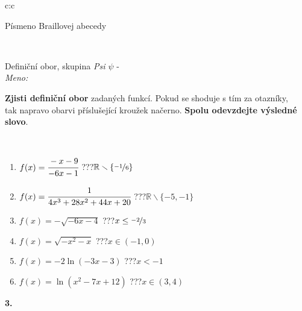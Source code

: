 \documentclass[10pt]{report}
\begin{document}
\begin{tabular}{c:c}
\begin{minipage}[c][104.5mm][t]{0.5\linewidth}
\begin{center}
\begin{minipage}{0.20\linewidth}
\begin{center}
{\small Písmeno Braillovej abecedy}
\end{center}
\end{minipage}
\end{center}
\end{minipage}
\\ \hdashline
\begin{minipage}[c][104.5mm][t]{0.5\linewidth}
\begin{center}
\vspace{7mm}
{\huge Definiční obor, skupina \textit{Psi $\psi$} -}\\[5mm]
\textit{Meno:}\phantom{xxxxxxxxxxxxxxxxxxxxxxxxxxxxxxxxxxxxxxxxxxxxxxxxxxxxxxxxxxxxxxxxx}\\[5mm]
\begin{minipage}{0.95\linewidth}
\textbf{Zjisti definiční obor} zadaných funkcí. Pokud se shoduje s tím za otazníky,\\tak napravo obarvi příslušející kroužek načerno. \textbf{Spolu odevzdejte výsledné slovo}.
\end{minipage}
\\[1mm]
\begin{minipage}{0.79\linewidth}
\begin{center}
\begin{varwidth}{\linewidth}
\begin{enumerate}
\normalsizerrr
\item $f(x)=\cfrac{-x-9}{-6x-1}$\quad \dotfill\; ???\;\dotfill \quad $\mathbb{R}\smallsetminus\{\nicefrac{-1}{6}\}$
\item $f(x)=\cfrac{1}{4x^3+28x^2+44x+20}$\quad \dotfill\; ???\;\dotfill \quad $\mathbb{R}\smallsetminus\{-5,-1\}$
\item $f(x)=-\sqrt{-6x-4}$\quad \dotfill\; ???\;\dotfill \quad $x\leq\nicefrac{-2}{3}$
\item $f(x)=\sqrt{-x^2-x}$\quad \dotfill\; ???\;\dotfill \quad $x\in(-1 , 0)$
\item $f(x)=-2\ln{(-3x-3)}$\quad \dotfill\; ???\;\dotfill \quad $x<-1$
\item $f(x)=\ln{(x^2-7x+12)}$\quad \dotfill\; ???\;\dotfill \quad $x\in(3 , 4)$
\end{enumerate}
\end{varwidth}
\end{center}
\end{minipage}
\begin{minipage}{0.20\linewidth}
\begin{center}
{\Huge\bfseries 3.} \\[2mm]

\end{center}
\end{minipage}
\end{center}
\end{minipage}
\end{tabular}
\end{document}
